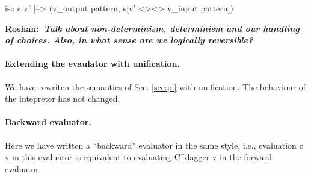 \documentclass[preprint]{sigplanconf}
\newcommand{\xcomment}[2]{\textbf{#1:~\textsl{#2}}}
\newcommand{\roshan}[1]{\xcomment{Roshan}{#1}}
\begin{document}
{{ iso s v' |--> (v_{output pattern}, s[v' <><> v_{input pattern}]) }}


\roshan{Talk about non-determinism, determinism and our handling of
  choices. Also, in what sense are we logically reversible?}

\paragraph{Extending the evaulator with unification.} 
We have rewriten the semantics of Sec. \ref{sec:pi} with
unification. The behaviour of the intepreter has not changed.


\paragraph{Backward evaluator.}
Here we have written a ``backward'' evaluator in the same style, 
i.e., evaluation {{c v}} in this evaluator is equivalent to evaluating
{{C^{dagger} v}} in the forward evaluator.

\end{document}
